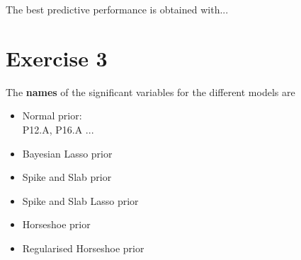 \documentclass[12pt]{article}
\begin{document}
The best predictive performance is obtained with...


\section*{Exercise 3}

The \textbf{names} of the significant variables for the different models are

\begin{itemize}
	\item Normal prior: \\
	P12.A, P16.A ...
	
	\item Bayesian Lasso prior
	
	\item Spike and Slab prior
	
	\item Spike and Slab Lasso prior
	
	\item Horseshoe prior
	
	\item Regularised Horseshoe prior
\end{itemize} 



\section*{}


\end{document}
